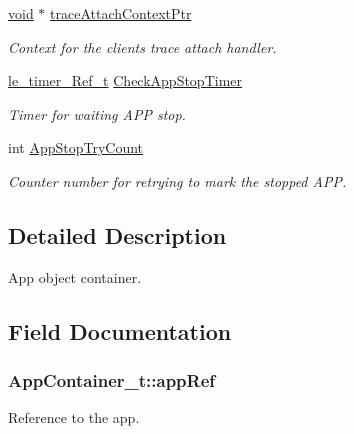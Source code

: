 \begin{DoxyCompactItemize}
\hyperlink{_t_e_m_p_l_a_t_e__cdef_8h_ac9c84fa68bbad002983e35ce3663c686}{void} $\ast$ \hyperlink{struct_app_container__t_a318bc109d60e6bd96c59334290bcb37c}{trace\+Attach\+Context\+Ptr}
\begin{DoxyCompactList}\small\item\em Context for the client\textquotesingle{}s trace attach handler. \end{DoxyCompactList}\item 
\hyperlink{le__timer_8h_a763fa6992488cdce3b5a820817094838}{le\+\_\+timer\+\_\+\+Ref\+\_\+t} \hyperlink{struct_app_container__t_a524e4b450641e567c38b3a9e0c5144ff}{Check\+App\+Stop\+Timer}
\begin{DoxyCompactList}\small\item\em Timer for waiting A\+PP stop. \end{DoxyCompactList}\item 
int \hyperlink{struct_app_container__t_a92806623f5991efa2af0d9fe6a3cdb65}{App\+Stop\+Try\+Count}
\begin{DoxyCompactList}\small\item\em Counter number for retrying to mark the stopped A\+PP. \end{DoxyCompactList}\end{DoxyCompactItemize}


\subsection{Detailed Description}
App object container. 

\subsection{Field Documentation}
\subsubsection[{\texorpdfstring{app\+Ref}{appRef}}]{ App\+Container\+\_\+t\+::app\+Ref}\hypertarget{struct_app_container__t_a08ad8f9a2564111f9acac2038de0197d}{}\label{struct_app_container__t_a08ad8f9a2564111f9acac2038de0197d}


Reference to the app. 

